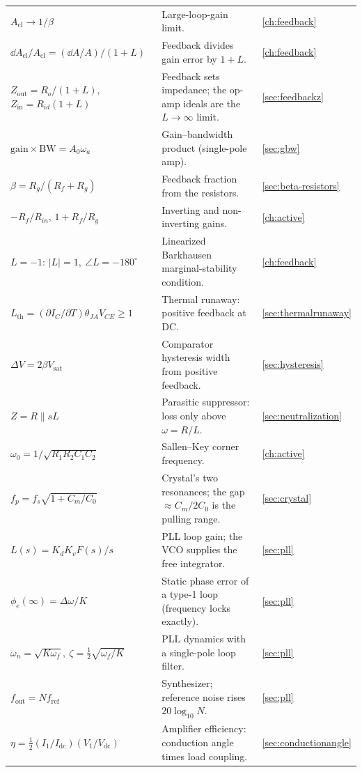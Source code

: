 \begin{longtable}{@{}L{0.31\textwidth}L{0.47\textwidth}L{0.14\textwidth}@{}}
\(A_{\mathrm{cl}}\to1/\beta\) & Large-loop-gain limit. & \cref{ch:feedback} \\
\(\dd A_{\mathrm{cl}}/A_{\mathrm{cl}}=(\dd A/A)/(1+L)\) & Feedback divides gain error by \(1+L\). & \cref{ch:feedback} \\
\(Z_{\mathrm{out}}=R_o/(1+L)\), \(Z_{\mathrm{in}}=R_{id}(1+L)\) & Feedback sets impedance; the op-amp ideals are the \(L\to\infty\) limit. & \cref{sec:feedbackz} \\
\(\text{gain}\times\text{BW}=A_0\omega_a\) & Gain--bandwidth product (single-pole amp). & \cref{sec:gbw} \\
\(\beta=R_g/(R_f+R_g)\) & Feedback fraction from the resistors. & \cref{sec:beta-resistors} \\
\(-R_f/R_{in}\), \(1+R_f/R_g\) & Inverting and non-inverting gains. & \cref{ch:active} \\
\(L=-1\): \(|L|=1,\ \angle L=-180^\circ\) & Linearized Barkhausen marginal-stability condition. & \cref{ch:feedback} \\
\(L_{\mathrm{th}}=(\partial I_C/\partial T)\theta_{JA}V_{CE}\ge1\) & Thermal runaway: positive feedback at DC. & \cref{sec:thermalrunaway} \\
\(\Delta V=2\beta V_{\mathrm{sat}}\) & Comparator hysteresis width from positive feedback. & \cref{sec:hysteresis} \\
\(Z=R\parallel sL\) & Parasitic suppressor: loss only above \(\omega=R/L\). & \cref{sec:neutralization} \\
\(\omega_0=1/\sqrt{R_1R_2C_1C_2}\) & Sallen--Key corner frequency. & \cref{ch:active} \\
\(f_p=f_s\sqrt{1+C_m/C_0}\) & Crystal's two resonances; the gap \(\approx C_m/2C_0\) is the pulling range. & \cref{sec:crystal} \\
\(L(s)=K_dK_vF(s)/s\) & PLL loop gain; the VCO supplies the free integrator. & \cref{sec:pll} \\
\(\phi_e(\infty)=\Delta\omega/K\) & Static phase error of a type-1 loop (frequency locks exactly). & \cref{sec:pll} \\
\(\omega_n=\sqrt{K\omega_f},\ \zeta=\tfrac12\sqrt{\omega_f/K}\) & PLL dynamics with a single-pole loop filter. & \cref{sec:pll} \\
\(f_{\mathrm{out}}=Nf_{\mathrm{ref}}\) & Synthesizer; reference noise rises \(20\log_{10}N\). & \cref{sec:pll} \\
\(\eta=\tfrac12(I_1/I_{\mathrm{dc}})(V_1/V_{\mathrm{dc}})\) & Amplifier efficiency: conduction angle times load coupling. & \cref{sec:conductionangle} \\

\end{longtable}

